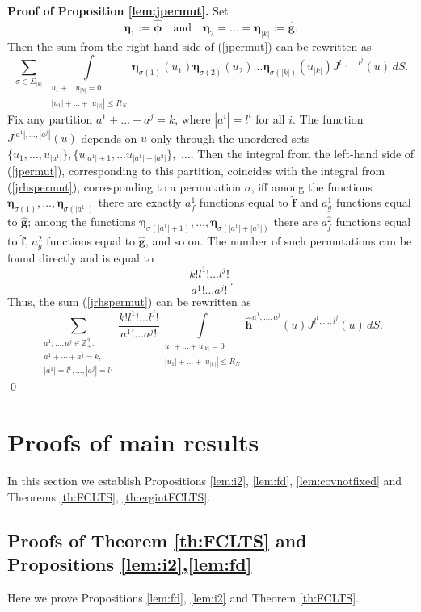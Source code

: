 \documentclass{article}
\numberwithin{equation}{section}
\newcommand{\mZ}{\mathbb{Z}}
\newcommand{\ssk}{\smallskip}
\newcommand{\fr}{\frac}
\newcommand{\qnd}{\quad\mbox{and}\quad}
\newcommand{\sli}{\sum\limits}
\newcommand{\ili}{\int\limits}
\newcommand{\lbl}{\label}
\newcommand{\bee}{\begin{equation}}
\newcommand{\eee}{\end{equation}}
\newcommand{\sck}{\substack}
\begin{document}
\ssk
{\bf Proof of Proposition \ref{lem:jpermut}.}
Set
$$
{\bm \eta}_1:=\hat {\bm \phi}
\qnd
{\bm \eta}_{2}=\ldots={\bm \eta}_{|k|}:=\hat{\bm g}.
$$
Then the sum from the right-hand side of (\ref{jpermut}) can be rewritten as
\bee\lbl{jrhspermut}
\sli_{\sigma\in \Sigma_{|k|}}\,
\ili_{\sck{u_1+\ldots u_{|k|}=0 \\ |u_1|+\ldots+|u_{|k|}|\leq R_N}}
{\bm \eta}_{\sigma(1)}(u_1){\bm \eta}_{\sigma(2)}(u_2)\ldots {\bm \eta}_{\sigma(|k|)}(u_{|k|})
J^{l^1,\ldots,l^j}(u)\,dS.
\eee
Fix any partition $a^1+\ldots+a^j=k$, where $|a^i|=l^i$ for all $i.$
The function $J^{|a^1|,\ldots,|a^j|}(u)$
depends on $u$ only through the
unordered sets
$\{u_1,\ldots, u_{|a^1|}\},\{u_{|a^1|+1},\ldots u_{|a^1|+|a^2|}\},$ $\ldots$.
Then the integral from the left-hand side of
(\ref{jpermut}),
corresponding to this partition,
coincides with
the integral from
(\ref{jrhspermut}),
corresponding to a permutation
$\sigma$,
iff
among the functions
${\bm \eta}_{\sigma(1)},\ldots,{\bm \eta}_{\sigma(|a^1|)}$
there are exactly
$a^1_f$ functions equal to $\hat {\bm f}$
and
$a^1_g$ functions equal to $\hat {\bm g}$;
among the functions
${\bm \eta}_{\sigma(|a^1|+1)},\ldots,{\bm \eta}_{\sigma(|a^1|+|a^2|)}$ there are
$a^2_f$ functions equal to $\hat {\bm f}$,
$a^2_g$ functions equal to $\hat {\bm g}$, and so on.
The number of such permutations can be found directly and is equal to
$$
\fr{k!l^1!\ldots l^j!}{a^1!\ldots a^j!}.
$$
Thus, the sum (\ref{jrhspermut}) can be rewritten as
$$
\sli_{\sck{a^1,\ldots,a^j\in\mZ^2_+: \\ a^1+\cdots+a^j=k, \\|a^1|=l^1, \ldots, |a^j|=l^j}}
\fr{k!l^1!\ldots l^j!}{a^1!\ldots a^j!}
\ili_{\sck{u_1+\ldots +u_{|k|}=0 \\ |u_1|+\ldots+|u_{|k|}|\leq R_N}}
\hat {\bm h}^{a^1,\ldots,a^j}(u) J^{l^1,\ldots,l^j}(u) \, dS.
$$
\qed





\section{Proofs of main results}
\lbl{sec:FCLT}
In this section we establish Propositions \ref{lem:i2}, \ref{lem:fd},   \ref{lem:covnotfixed} and Theorems \ref{th:FCLTS}, \ref{th:ergintFCLTS}.


\subsection{Proofs of Theorem \ref{th:FCLTS} and Propositions  \ref{lem:i2},\ref{lem:fd}}
\lbl{sec:FCLTS}
Here we prove Propositions \ref{lem:fd}, \ref{lem:i2}  and Theorem \ref{th:FCLTS}.
\end{document}
